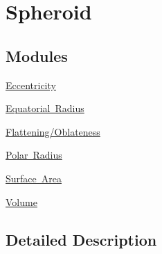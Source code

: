 \hypertarget{group___e_g_x_math-_geometry-3_d-_spheroid}{}\section{Spheroid}
\label{group___e_g_x_math-_geometry-3_d-_spheroid}
\subsection*{Modules}
\begin{DoxyCompactItemize}
\item 
\mbox{\hyperlink{group___e_g_x_math-_geometry-3_d-_spheroid-_eccentricity}{Eccentricity}}
\item 
\mbox{\hyperlink{group___e_g_x_math-_geometry-3_d-_spheroid-_equatorial_radius}{Equatorial Radius}}
\item 
\mbox{\hyperlink{group___e_g_x_math-_geometry-3_d-_spheroid-_flattening}{Flattening/\+Oblateness}}
\item 
\mbox{\hyperlink{group___e_g_x_math-_geometry-3_d-_spheroid-_polar_radius}{Polar Radius}}
\item 
\mbox{\hyperlink{group___e_g_x_math-_geometry-3_d-_spheroid-_surface_area}{Surface Area}}
\item 
\mbox{\hyperlink{group___e_g_x_math-_geometry-3_d-_spheroid-_volume}{Volume}}
\end{DoxyCompactItemize}


\subsection{Detailed Description}
